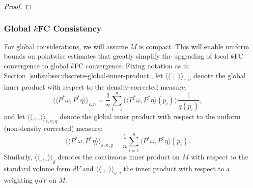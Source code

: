 \documentclass{article}
\let\todo\undefined
\let\todo\undefined
\newcommand{\todo}[1][]{}
\theoremstyle{remark}
\theoremstyle{plain}
\begin{document}
\begin{proof}


\end{proof}

\subsubsection{Global \( k \)FC Consistency}
\label{subsubsec:global-kfc-consistency}


For global considerations, we will assume $M$ is compact. This will enable uniform bounds on pointwise estimates that greatly simplify the upgrading of local $k$FC convergence to global $k$FC convergence. Fixing notation as in Section~\ref{subsubsec:discrete-global-inner-product}, let $\langle \! \langle \_, \_ \rangle \! \rangle_{\varepsilon, n}$ denote the global inner product with respect to the density-corrected measure, $$\langle \! \langle P^{*} \omega , P^{*}\eta \rangle \! \rangle  _{\varepsilon, n }=\frac{1}{n}\sum_{i=1}^{n}\big(\langle P^{*}\omega, P^{*} \eta \rangle(p_{i}) \big)  \, \frac{1}{q(p_{i})},$$
and let $\langle \! \langle \_,  \_ \rangle \! \rangle_{\varepsilon, n, q}$ denote the global inner product with respect to the uniform (non-density corrected) measure: $$\langle \! \langle P^{*}\omega, P^{*}\eta \rangle \! \rangle_{\varepsilon, n,q} = \frac{1}{n} \sum_{i=1}^{n} \langle P^{*}\omega, P^{*}\eta \rangle  (p_{i}).$$
Similarly, $\langle \! \langle \_,\_ \rangle \! \rangle_{g}$ denotes the continuous inner product on $M$ with respect to the standard volume form $dV$ and $\langle \! \langle \_, \_ \rangle \! \rangle_{g, q}$ the inner product with respect to a weighting $q\, dV$ on \( M \). 
\end{document}
